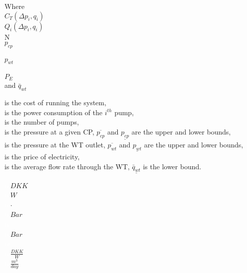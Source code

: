 \begin{minipage}[t]{0.20\textwidth}
 Where\\
 \hspace*{8mm} $C_T(\Delta{p}_i,q_i)$ \\
 \hspace*{8mm} $Q_i(\Delta{p}_i,q_i)$ \\
 \hspace*{8mm} N \\
 \hspace*{8mm} $p_{cp}$ \\
 \hspace*{8mm}  \textcolor{White}{te}\\
 \hspace*{8mm} $p_{wt}$ \\
 \hspace*{8mm}  \textcolor{White}{te}\\
 \hspace*{8mm} $P_E$ \\
  and \hspace*{0.7mm} $\bar{q}_{wt}$	
 \end{minipage}
 \begin{minipage}[t]{0.68\textwidth}
 \vspace*{2mm}
 is the cost of running the system, \\
 is the power consumption of the $i^{th}$ pump,\\
 is the number of pumps,\\
 is the pressure at a given CP, $\overline{p_{cp}}$ and $\underline{p_{cp}}$ are the upper and lower bounds,\\
 is the pressure at the WT outlet, $\overline{p_{wt}}$ and $\underline{p_{wt}}$ are the upper and lower bounds,\\
 is the price of electricity,\\ 
 is the average flow rate through the WT, $\underline{\bar{q}_{wt}}$ is the lower bound.
 \end{minipage}
 \begin{minipage}[t]{0.10\textwidth}
 \vspace*{2mm}
 \textcolor{White}{te}$\unit{DKK}$\\
 \textcolor{White}{te}$\unit{W}$\\
 \textcolor{White}{te}$\unit{\cdot}$\\
 \textcolor{White}{te}$\unit{Bar}$\\
 \hspace*{8mm}  \textcolor{White}{te}\\
 \textcolor{White}{te}$\unit{Bar}$\\
 \hspace*{8mm}  \textcolor{White}{te}\\
 \textcolor{White}{te}$\unit{\frac{DKK}{W}}$\\
  \textcolor{White}{te}$\unit{\frac{m^3}{day}}$
 \end{minipage}

